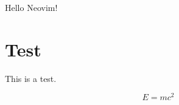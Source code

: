 \documentclass{article}
\begin{document}
Hello Neovim!

\section{Test}

This is a test.

\begin{equation}
	E = mc^2
\end{equation}
\end{document}

